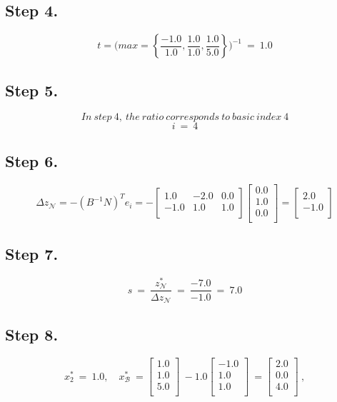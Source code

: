 \documentclass [12pt] {article}
\begin{document}
\subsection{Step 4.}
\[
t =\Bigg(
max= \left\{\frac{-1.0}{1.0},\frac{1.0}{1.0},\frac{1.0}{5.0}\right\}
\Bigg)^{-1}\ =\ 1.0
\]
\subsection{Step 5.}
\[
In\ step\ 4, \ the\ ratio\ corresponds\ to\ basic\ index\ 4
\]
\[
i\ = \ 4
\]
\subsection{Step 6.}
\[
\Delta z_{\mathcal N}= -( B^{-1} N )^{T}e_i = -\begin{bmatrix}
1.0 & -2.0 & 0.0 \\ -1.0 & 1.0 & 1.0 \\ 
\end{bmatrix}
\begin{bmatrix}
0.0 \\ 1.0 \\ 0.0 \\ 
\end{bmatrix}
= \begin{bmatrix}
2.0 \\ -1.0 \\ 
\end{bmatrix}
\]
\subsection{Step 7.}
\[
s \ =\ \frac{z_{\mathcal N}^{*}}{ \Delta z_{\mathcal N}}\ =\ \frac{-7.0}{-1.0}\ =\ 7.0
\]
\subsection{Step 8.}
\[
x_{2}^{*}\ =\ 1.0, \quad x_{\mathcal B}^{*}\ =\begin{bmatrix}
1.0 \\ 1.0 \\ 5.0 \\ 
\end{bmatrix}\ -1.0\begin{bmatrix}
-1.0 \\ 1.0 \\ 1.0 \\ 
\end{bmatrix}\ =\begin{bmatrix}
2.0 \\ 0.0 \\ 4.0 \\ 
\end{bmatrix}\ ,
\]
\
\end{document}
